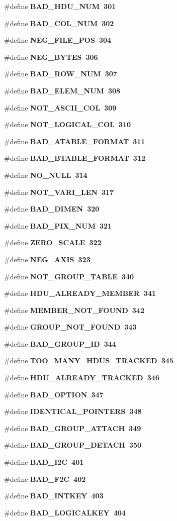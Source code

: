 \begin{CompactItemize}
\#define \bf{BAD\_\-HDU\_\-NUM}~301
\item 
\#define \bf{BAD\_\-COL\_\-NUM}~302
\item 
\#define \bf{NEG\_\-FILE\_\-POS}~304
\item 
\#define \bf{NEG\_\-BYTES}~306
\item 
\#define \bf{BAD\_\-ROW\_\-NUM}~307
\item 
\#define \bf{BAD\_\-ELEM\_\-NUM}~308
\item 
\#define \bf{NOT\_\-ASCII\_\-COL}~309
\item 
\#define \bf{NOT\_\-LOGICAL\_\-COL}~310
\item 
\#define \bf{BAD\_\-ATABLE\_\-FORMAT}~311
\item 
\#define \bf{BAD\_\-BTABLE\_\-FORMAT}~312
\item 
\#define \bf{NO\_\-NULL}~314
\item 
\#define \bf{NOT\_\-VARI\_\-LEN}~317
\item 
\#define \bf{BAD\_\-DIMEN}~320
\item 
\#define \bf{BAD\_\-PIX\_\-NUM}~321
\item 
\#define \bf{ZERO\_\-SCALE}~322
\item 
\#define \bf{NEG\_\-AXIS}~323
\item 
\#define \bf{NOT\_\-GROUP\_\-TABLE}~340
\item 
\#define \bf{HDU\_\-ALREADY\_\-MEMBER}~341
\item 
\#define \bf{MEMBER\_\-NOT\_\-FOUND}~342
\item 
\#define \bf{GROUP\_\-NOT\_\-FOUND}~343
\item 
\#define \bf{BAD\_\-GROUP\_\-ID}~344
\item 
\#define \bf{TOO\_\-MANY\_\-HDUS\_\-TRACKED}~345
\item 
\#define \bf{HDU\_\-ALREADY\_\-TRACKED}~346
\item 
\#define \bf{BAD\_\-OPTION}~347
\item 
\#define \bf{IDENTICAL\_\-POINTERS}~348
\item 
\#define \bf{BAD\_\-GROUP\_\-ATTACH}~349
\item 
\#define \bf{BAD\_\-GROUP\_\-DETACH}~350
\item 
\#define \bf{BAD\_\-I2C}~401
\item 
\#define \bf{BAD\_\-F2C}~402
\item 
\#define \bf{BAD\_\-INTKEY}~403
\item 
\#define \bf{BAD\_\-LOGICALKEY}~404
\item 

\end{CompactItemize}
